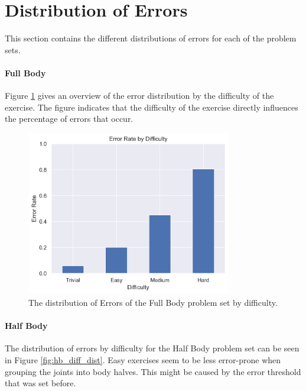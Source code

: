 \section{Distribution of Errors}

This section contains the different distributions of errors for each of the problem sets.

\paragraph{Full Body}

Figure \ref{fig:fb_diff_dist} gives an overview of the error distribution by the difficulty of the exercise. The figure indicates that the difficulty of the exercise directly influences the percentage of errors that occur.

\begin{figure}[ht]
  \centering
  \includegraphics[width=0.8\textwidth]{figures/Data/dist_full_body/Error_Rate_by_Difficulty.png}
  \caption[Error Distribution of the Full Body by difficulty]{The distribution of Errors of the Full Body problem set by difficulty.}
  \label{fig:fb_diff_dist}
\end{figure}

\paragraph{Half Body}

The distribution of errors by difficulty for the Half Body problem set can be seen in Figure \ref{fig:hb_diff_dist}. Easy exercises seem to be less error-prone when grouping the joints into body halves. This might be caused by the error threshold that was set before.

